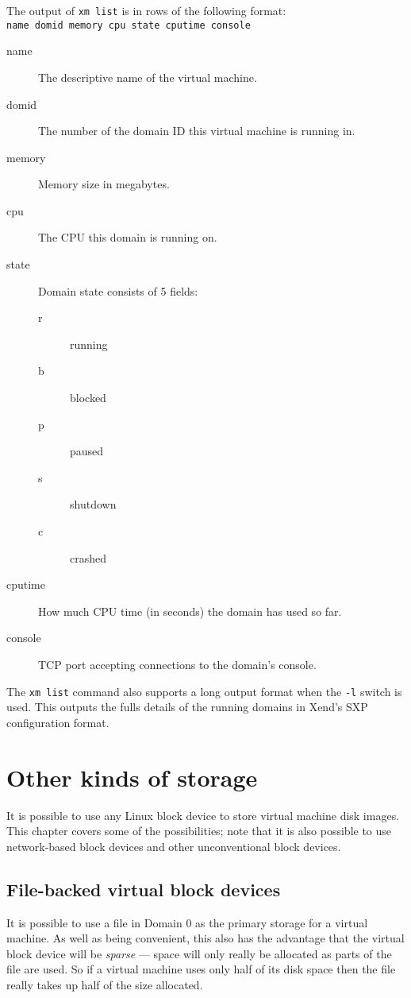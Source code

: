 \documentclass[11pt,twoside,final,openright]{xenstyle}
\begin{document}
The output of {\tt xm list} is in rows of the following format:\\
\verb_name domid memory cpu state cputime console_

\begin{description}
\item[name]  The descriptive name of the virtual machine.
\item[domid] The number of the domain ID this virtual machine is running in.
\item[memory] Memory size in megabytes.
\item[cpu]   The CPU this domain is running on.
\item[state] Domain state consists of 5 fields:
  \begin{description}
  \item[r] running
  \item[b] blocked
  \item[p] paused
  \item[s] shutdown
  \item[c] crashed
  \end{description}
\item[cputime] How much CPU time (in seconds) the domain has used so far.
\item[console] TCP port accepting connections to the domain's console.
\end{description}

The {\tt xm list} command also supports a long output format when the
{\tt -l} switch is used.  This outputs the fulls details of the
running domains in Xend's SXP configuration format.

\chapter{Other kinds of storage}

It is possible to use any Linux block device to store virtual machine
disk images.  This chapter covers some of the possibilities; note that
it is also possible to use network-based block devices and other
unconventional block devices.

\section{File-backed virtual block devices}

It is possible to use a file in Domain 0 as the primary storage for a
virtual machine.  As well as being convenient, this also has the
advantage that the virtual block device will be {\em sparse} --- space
will only really be allocated as parts of the file are used.  So if a
virtual machine uses only half of its disk space then the file really
takes up half of the size allocated.
\end{document}
